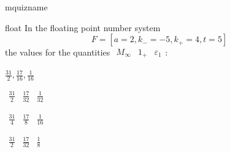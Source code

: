 \documentclass[12pt]{article}
\begin{document}
\begin{quiz}{mquizname}


\begin{multi}{float}
In the floating point number system $$  F=\left[ a=2, k_{-}=-5, k_{+}=4, t=5 \right]  $$ the values for the quantities 
$ {\begin{array}{ccc}M_{\infty}& 1_{+}& \varepsilon_{1}\end{array}} $:
\item* $ \frac{31}{2}, \frac{17}{16}, \frac{1}{16} $
\item  $ {\begin{array}{ccc}\frac{31}{2}& \frac{17}{32}& \frac{1}{32}\end{array}} $
\item  $ {\begin{array}{ccc}\frac{31}{4}& \frac{17}{8}& \frac{1}{16}\end{array}} $
\item  $ {\begin{array}{ccc}\frac{31}{2}& \frac{17}{32}& \frac{1}{8}\end{array}} $
\end{multi}

\end{quiz}
\end{document}
